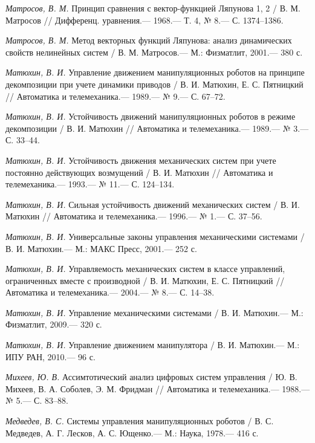 \begin{thebibliography}{10}
	{\it Матросов, В. М.} Принцип сравнения с вектор-функцией Ляпунова 1, 2 / В. М. Матросов
	// Дифференц. уравнения.— 1968.— Т. 4, № 8.— С. 1374–1386.
	
	{\it Матросов, В. М.} Метод векторных функций Ляпунова: анализ динамических свойств нелинейных систем / В. М. Матросов.— М.: Физматлит, 2001.— 380 с.
	
	{\it Матюхин, В. И.} Управление движением манипуляционных роботов на принципе декомпозиции при учете динамики приводов
	/ В. И. Матюхин, Е. С. Пятницкий // Автоматика и телемеханика.— 1989.— № 9.— С. 67–72.
	
	{\it Матюхин, В. И.} Устойчивость движений манипуляционных роботов в режиме декомпозиции
	/ В. И. Матюхин // Автоматика и телемеханика.— 1989.— № 3.— С. 33–44.
	
	{\it Матюхин, В. И.} Устойчивость движения механических систем при учете постоянно действующих возмущений
	/ В. И. Матюхин // Автоматика и телемеханика.— 1993.— № 11.— С. 124–134.
	
	{\it Матюхин, В. И.} Сильная устойчивость движений механических систем
	/ В. И. Матюхин // Автоматика и телемеханика.— 1996.— № 1.— С. 37–56.
	
	{\it Матюхин, В. И.} Универсальные законы управления механическими системами /
	В. И. Матюхин.— М.: МАКС Пресс, 2001.— 252 с.
	
	{\it Матюхин, В. И.} Управляемость механических систем в классе управлений, ограниченных вместе с производной
	/ В. И. Матюхин, Е. С. Пятницкий // Автоматика и телемеханика.— 2004.— № 8.— С. 14–38.
	
	{\it Матюхин, В. И.} Управление механическими системами / В. И. Матюхин.— М.: Физматлит,
	2009.— 320 с.
	
	{\it Матюхин, В. И.} Управление движением манипулятора / В. И. Матюхин.— М.: ИПУ
	РАН, 2010.— 96 с.
	
	{\it Михеев, Ю. В.} Ассимтотический анализ цифровых систем управления / Ю. В. Михеев, В. А. Соболев, Э. М. Фридман // Автоматика и телемеханика.— 1988.— № 5.— С. 83–88.
	
	{\it Медведев, В. С.} Системы управления манипуляционных роботов / В. С. Медведев,
	А. Г. Лесков, А. С. Ющенко.— М.: Наука, 1978.— 416 с.
	

\end{thebibliography}
